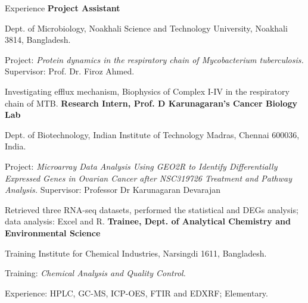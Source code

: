 \begin{rubric}{Experience}
    \entry*[2021 - ]%
        \textbf{Project Assistant}\par Dept. of Microbiology, Noakhali Science and Technology University, Noakhali 3814, Bangladesh.\par
        Project: \emph{Protein dynamics in the respiratory chain of Mycobacterium tuberculosis.} Supervisor: Prof. Dr. Firoz Ahmed. \par 
        Investigating efflux mechanism, Biophysics of Complex I-IV in the respiratory chain of MTB.
    \entry*[2020]%
        \textbf{Research Intern, Prof. D Karunagaran's Cancer Biology Lab}\par Dept. of Biotechnology, Indian Institute of Technology Madras, Chennai 600036, India.\par
        Project: \emph{Microarray Data Analysis Using GEO2R to Identify Differentially Expressed Genes in Ovarian Cancer after NSC319726 Treatment and Pathway Analysis.} Supervisor: Professor Dr Karunagaran Devarajan \par 
        Retrieved three RNA-seq datasets, performed the statistical and DEGs analysis; data analysis: Excel and R.
    \entry*[2019]%
        \textbf{Trainee, Dept. of Analytical Chemistry and Environmental Science} \par
        Training Institute for Chemical Industries, Narsingdi 1611, Bangladesh.\par
        Training: \emph{Chemical Analysis and Quality Control.} \par 
        Experience: HPLC, GC-MS, ICP-OES, FTIR and EDXRF; Elementary.
    \end{rubric}